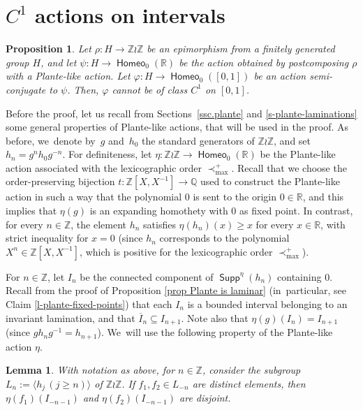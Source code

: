 \documentclass[10pt]{amsart}
\newtheorem{lem}[thm]{Lemma}
\newtheorem{prop}[thm]{Proposition}
\theoremstyle{definition}
\DeclareMathOperator{\homeo}{\mathsf{Homeo}}
\DeclareMathOperator{\supp}{\mathsf{Supp}}
\newcommand{\R}{\mathbb{R}}
\newcommand{\Q}{\mathbb Q}
\newcommand{\Z}{\mathbb Z}
\begin{document}
\section{\texorpdfstring{$C^1$}{C1} actions on intervals} \label{sc.C1}
\begin{prop}\label{p-plante-C1}
Let $\rho\colon H\to \Z\wr \Z$ be an epimorphism from a finitely generated group $H$, and let $\psi \colon H\to \homeo_0(\R)$ be the action obtained by postcomposing $\rho$ with a Plante-like action. Let $\varphi\colon H\to \homeo_0([0, 1])$ be an action semi-conjugate to $\psi$. Then, $\varphi$ cannot be of class $C^1$ on $[0,1]$.
\end{prop}
Before the proof, let us recall from Sections~\ref{ssc.plante} and \ref{s-plante-laminations} some general properties of Plante-like actions, that will be used in the proof.
As before, we~denote by~$g$ and~$h_0$ the standard generators of $\Z \wr \Z$, and set $h_n=g^n h_0g^{-n}$. For definiteness, let $\eta\colon \Z\wr\Z\to \homeo_0(\R)$ be the Plante-like action associated with the lexicographic order $\prec_{\max}^{+}$. Recall that we choose the order-preserving bijection $t\colon \Z[X, X^{-1}]\to \Q$ used to construct the Plante-like action in such a way that the polynomial 0 is sent to the origin $0\in \R$, and this implies that $\eta(g)$ is an expanding homothety with $0$ as fixed point. In contrast, for every $n\in \Z$, the element $h_n$ satisfies $\eta(h_n)(x)\ge x$ for every $x\in \R$, with strict inequality for $x=0$ (since $h_n$ corresponds to the polynomial $X^n\in \Z[X, X^{-1}]$, which is positive for the lexicographic order $\prec_{\max}^+$).

For $n\in \Z$, let $I_n$ be the connected component of $\supp^\eta(h_n)$ containing $0$. Recall from the proof of Proposition \ref{prop Plante is laminar} (in~particular, see Claim \ref{l-plante-fixed-points}) that each $I_n$ is a bounded interval belonging to an invariant lamination, and that $\overline{I}_n\subseteq I_{n+1}$. Note also that $\eta(g)(I_n)=I_{n+1}$ (since $gh_ng^{-1}=h_{n+1}$). We~will use the following property of the Plante-like action $\eta$.
\begin{lem} \label{l-disjoint-intervals}
With notation as above, for $n\in \Z$, consider the subgroup $L_n:=\langle h_j\, (j\geq n)\rangle$ of $\Z\wr \Z$.
If $f_1, f_2\in L_{-n}$ are distinct elements, then $\eta(f_1)(I_{-n-1})$ and $\eta(f_2)(I_{-n-1})$ are disjoint.
\end{lem}
\end{document}
